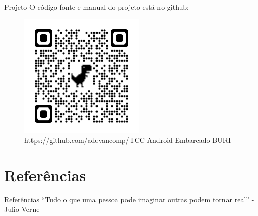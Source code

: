 \documentclass[12pt]{beamer}
\begin{document}
    \begin{frame}{Projeto}
        O código fonte e manual do projeto está no github:
        \begin{figure}[ht]
            \centering
            \includegraphics[width=0.53\textwidth]{./img/qrcode-buri.png}
            \caption{https://github.com/adevancomp/TCC-Android-Embarcado-BURI}\label{fig:buriTRab}
        \end{figure}
    \end{frame}

    \section{Referências}

    \begin{frame}{Referências}
        ``Tudo o que uma pessoa pode imaginar outras podem tornar real'' - Julio Verne
    \end{frame}
    
    \printbibliography
\end{document}
